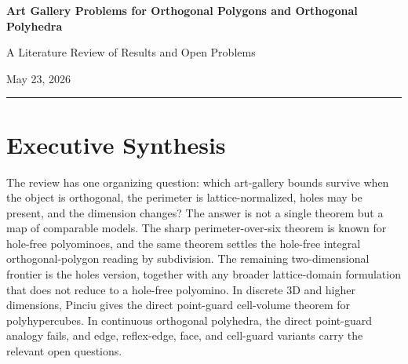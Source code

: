 \documentclass[11pt]{article}
\newcommand{\floor}[1]{\left\lfloor #1 \right\rfloor}
\begin{document}
\thispagestyle{plain}
\begin{center}
{\LARGE\bfseries Art Gallery Problems for Orthogonal Polygons and Orthogonal Polyhedra\par}
\vspace{0.5em}
{\large A Literature Review of Results and Open Problems\par}
\vspace{0.85em}
{\normalsize May 23, 2026\par}
\vspace{1.1em}
\textcolor{ReviewRule}{\rule{0.88\textwidth}{0.6pt}}
\end{center}

\begin{abstract}
This review surveys art-gallery problems for orthogonal polygons,
polyominoes, and orthogonal polyhedra, with emphasis on perimeter-type bounds,
holes, and the model changes that produce current open problems.  In two
dimensions, the perimeter-over-six question is meaningful only after fixing a
lattice scale.  Ma{\ss}berg proves the tight $\floor{\ell/6}$ point-guard
bound for hole-free polyominoes, and that theorem also covers hole-free
integral orthogonal polygons after unit-grid subdivision.  The unresolved
perimeter-over-six direction is therefore the version with holes, or a
broader lattice-domain formulation not reducible to the hole-free polyomino
case.  In discrete 3D and higher dimensions, the cell-volume analogue is known:
Pinciu proves the tight $\floor{(m+1)/3}$ point-guard theorem for
$m$-polyhypercubes.  For arbitrary continuous orthogonal polyhedra, however,
point guards do not give a linear planar analogue: some examples require
$\Theta(n^{3/2})$ guards.  The continuous 3D literature consequently turns to
edge guards, reflex-edge guards, and face guards, while discrete voxel/cell
guard variants form a separate line of open problems.
\end{abstract}

\tableofcontents
\clearpage

\section{Executive Synthesis}

The review has one organizing question: which art-gallery bounds survive when
the object is orthogonal, the perimeter is lattice-normalized, holes may be
present, and the dimension changes?  The answer is not a single theorem but a
map of comparable models.  The sharp perimeter-over-six theorem is known for
hole-free polyominoes, and the same theorem settles the hole-free integral
orthogonal-polygon reading by subdivision.  The remaining two-dimensional
frontier is the holes version, together with any broader lattice-domain
formulation that does not reduce to a hole-free polyomino.  In discrete 3D and
higher dimensions, Pinciu gives the direct point-guard cell-volume theorem for
polyhypercubes.  In continuous orthogonal polyhedra, the direct point-guard
analogy fails, and edge, reflex-edge, face, and cell-guard variants carry the
relevant open questions.
\end{document}
